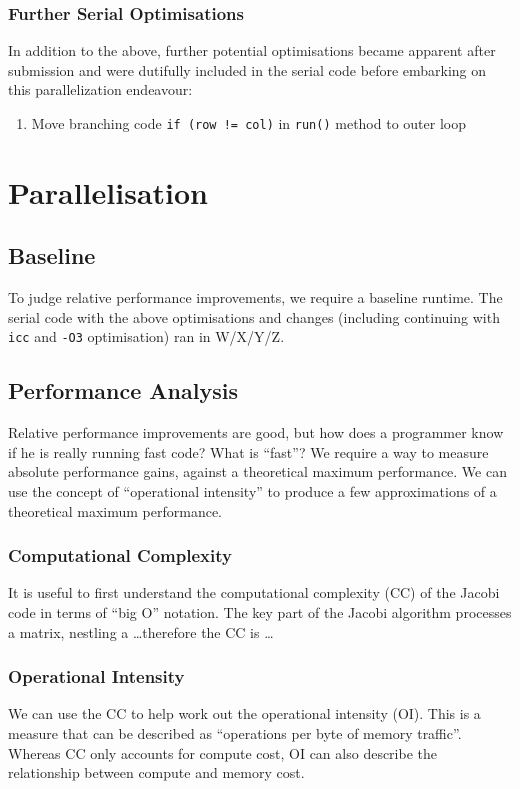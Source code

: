 \documentclass{article}
\begin{document}
\subsubsection{Further Serial Optimisations}
In addition to the above, further potential optimisations became
apparent after submission and were dutifully included in the serial
code before embarking on this parallelization endeavour:

\begin{enumerate}
\item Move branching code \texttt{if (row != col)} in \texttt{run()}
  method to outer loop
\end{enumerate}

\section{Parallelisation}

\subsection{Baseline}
To judge relative performance improvements, we require a baseline
runtime. The serial code with the above optimisations and changes
(including continuing with \texttt{icc} and \texttt{-O3} optimisation)
ran in W/X/Y/Z.

\subsection{Performance Analysis}
Relative performance improvements are good, but how does a programmer
know if he is really running fast code? What is ``fast''? We require a
way to measure absolute performance gains, against a theoretical
maximum performance. We can use the concept of ``operational
intensity'' to produce a few approximations of a theoretical maximum
performance.

\subsubsection{Computational Complexity}
It is useful to first understand the computational complexity (CC) of
the Jacobi code in terms of ``big O'' notation. The key part of the
Jacobi algorithm processes a matrix, nestling a \ldots therefore the
CC is \ldots

\subsubsection{Operational Intensity}
We can use the CC to help work out the operational intensity
(OI). This is a measure that can be described as ``operations per byte
of memory traffic''. Whereas CC only accounts for compute cost, OI can
also describe the relationship between compute and memory cost.
\end{document}
